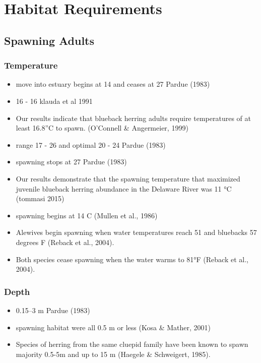 \documentclass[
]{book}
\providecommand{\tightlist}{%
  \setlength{\itemsep}{0pt}\setlength{\parskip}{0pt}}
\begin{document}
\hypertarget{habitat-requirements-1}{%
\section{Habitat Requirements}\label{habitat-requirements-1}}

\hypertarget{spawning-adults}{%
\subsection{Spawning Adults}\label{spawning-adults}}

\hypertarget{temperature-6}{%
\subsubsection{Temperature}\label{temperature-6}}

\begin{itemize}
\item
  move into estuary begins at 14 and ceases at 27 Pardue (1983)
\item
  16 - 16 klauda et al 1991
\item
  Our results indicate that blueback herring adults require temperatures of at least 16.8''C to spawn. (O'Connell \& Angermeier, 1999)
\item
  range 17 - 26 and optimal 20 - 24 Pardue (1983)
\item
  spawning stops at 27 Pardue (1983)
\item
  Our results demonstrate that the spawning temperature that maximized juvenile blueback herring abundance in the Delaware River was 11 °C (tommasi 2015)
\item
  spawning begins at 14 C (Mullen et al., 1986)
\item
  Alewives begin spawning when water temperatures reach 51 and bluebacks 57 degrees F (Reback et al., 2004).
\item
  Both species cease spawning when the water warms to 81°F (Reback et al., 2004).
\end{itemize}

\hypertarget{depth-6}{%
\subsubsection{Depth}\label{depth-6}}

\begin{itemize}
\tightlist
\item
  0.15--3 m Pardue (1983)
\item
  spawning habitat were all 0.5 m or less (Kosa \& Mather, 2001)
\item
  Species of herring from the same cluepid family have been known to spawn majority 0.5-5m and up to 15 m (Haegele \& Schweigert, 1985).
\end{itemize}
\end{document}
